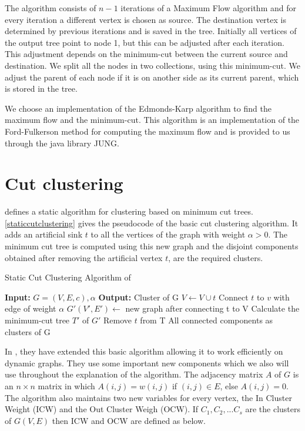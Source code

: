 The algorithm consists of $n-1$ iterations of a Maximum Flow algorithm and for every iteration a different vertex is chosen as source. The destination vertex is determined by previous iterations and is saved in the tree. Initially all vertices of the output tree point to node 1, but this can be adjusted after each iteration. This adjustment depends on the minimum-cut between the current source and destination. We split all the nodes in two collections, using this minimum-cut. We adjust the parent of each node if it is on another side as its current parent, which is stored in the tree.

We choose an implementation of the Edmonds-Karp algorithm to find the maximum flow and the minimum-cut. This algorithm is an implementation of the Ford-Fulkerson method for computing the maximum flow and is provided to us through the java library JUNG.

\section{Cut clustering}

\cite{flake2004graph} defines a static algorithm for clustering based on minimum cut trees. \autoref{staticcutclustering} gives the pseudocode of the basic cut clustering algorithm. It adds an artificial sink $t$ to all the vertices of the graph with weight $\alpha > 0$. The minimum cut tree is computed using this new graph and the disjoint components obtained after removing the artificial vertex $t$, are the required clusters.

\begin{algorithm}
\caption{Static Cut Clustering Algorithm of \cite{flake2004graph}}
\label{staticcutclustering}
\begin{algorithmic}
\STATE \textbf{Input:} $G = (V,E,c), \alpha$ 
\STATE \textbf{Output:} Cluster of G
\STATE $V \leftarrow V \cup t$
	\STATE Connect $t$ to $v$ with edge of weight $\alpha$
\ENDFOR
\STATE $G'(V',E') \leftarrow$ new graph after connecting t to V
\STATE Calculate the minimum-cut tree $T'$ of $G'$
\STATE Remove $t$ from T
\RETURN All connected components as clusters of G
\end{algorithmic}
\end{algorithm}

In \cite{saha2006dynamic}, they have extended this basic algorithm allowing it to work efficiently on dynamic graphs. They use some important new components which we also will use throughout the explanation of the algorithm. The adjacency matrix $A$ of $G$ is an $n \times n$ matrix in which $A(i,j) = w(i,j)$ if $(i,j) \in E$, else $A(i,j) = 0$. The algorithm also maintains two new variables for every vertex, the In Cluster Weight (ICW) and the Out Cluster Weigh (OCW). If $C_1,C_2,...C_s$ are the clusters of $G(V,E)$ then ICW and OCW are defined as below.

